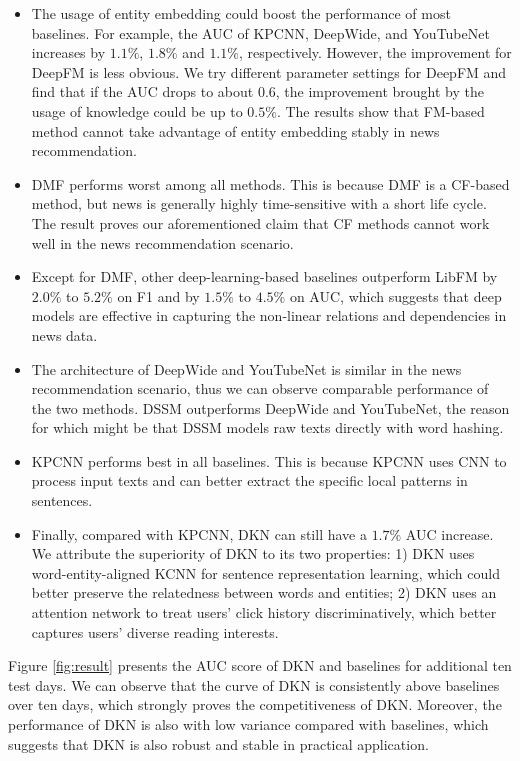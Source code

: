 \documentclass[sigconf]{acmart}
\begin{document}
			\begin{itemize}
				\item
					The usage of entity embedding could boost the performance of most baselines.
					For example, the AUC of KPCNN, DeepWide, and YouTubeNet increases by $1.1\%$, $1.8\%$ and $1.1\%$, respectively.
					However, the improvement for DeepFM is less obvious.
					We try different parameter settings for DeepFM and find that if the AUC drops to about $0.6$, the improvement brought by the usage of knowledge could be up to $0.5\%$.
					The results show that FM-based method cannot take advantage of entity embedding stably in news recommendation.
				\item
					DMF performs worst among all methods.
					This is because DMF is a CF-based method, but news is generally highly time-sensitive with a short life cycle.
					The result proves our aforementioned claim that CF methods cannot work well in the news recommendation scenario.
				\item
					Except for DMF, other deep-learning-based baselines outperform LibFM by $2.0\%$ to $5.2\%$ on F1 and by $1.5\%$ to $4.5\%$ on AUC, which suggests that deep models are effective in capturing the non-linear relations and dependencies in news data.
				\item
					The architecture of DeepWide and YouTubeNet is similar in the news recommendation scenario, thus we can observe comparable performance of the two methods.
					DSSM outperforms DeepWide and YouTubeNet, the reason for which might be that DSSM models raw texts directly with word hashing.
				\item
					KPCNN performs best in all baselines.
					This is because KPCNN uses CNN to process input texts and can better extract the specific local patterns in sentences.
				\item
					Finally, compared with KPCNN, DKN can still have a $1.7\%$ AUC increase.
					We attribute the superiority of DKN to its two properties:
					1) DKN uses word-entity-aligned KCNN for sentence representation learning, which could better preserve the relatedness between words and entities;
					2) DKN uses an attention network to treat users' click history discriminatively, which better captures users' diverse reading interests.
			\end{itemize}
					
		Figure \ref{fig:result} presents the AUC score of DKN and baselines for additional ten test days.
		We can observe that the curve of DKN is consistently above baselines over ten days, which strongly proves the competitiveness of DKN.
		Moreover, the performance of DKN is also with low variance compared with baselines, which suggests that DKN is also robust and stable in practical application.
				
\end{document}
